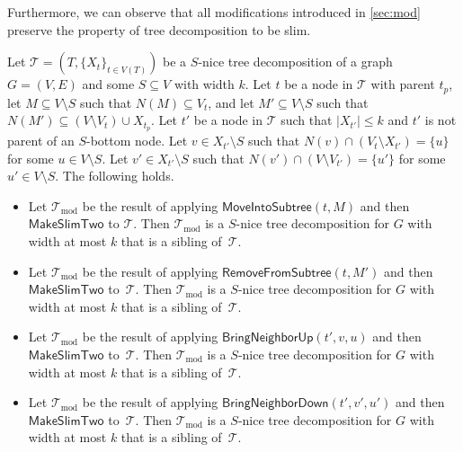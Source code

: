 \documentclass[a4paper,UKenglish,cleveref, autoref, thm-restate, numberwithinsect]{lipics-v2021}
\newcounter{modification}
\newcommand{\slim}{\text{slim}\xspace}
\newcommand{\MoveIntoSubtree}{\mathsf{MoveIntoSubtree}}
\newcommand{\RemoveFromSubtree}{\mathsf{RemoveFromSubtree}}
\newcommand{\BringNeighborUp}{\mathsf{BringNeighborUp}}
\newcommand{\BringNeighborDown}{\mathsf{BringNeighborDown}}
\newcommand{\MakeSlimTwo}{\mathsf{MakeSlimTwo}}
\begin{document}
Furthermore, we can observe that all modifications introduced in \cref{sec:mod} preserve the property of tree decomposition to be slim.
\begin{observation} \label{lem:preserveslim}
     Let $\mathcal{T}=(T,\{X_t\}_{t\in V(T)})$ be a \slim $S$-nice tree decomposition of a graph $G=(V,E)$ and some $S\subseteq V$ with width $k$. Let $t$ be a node in $\mathcal{T}$ with parent $t_p$, let $M\subseteq V\setminus S$ such that $N(M)\subseteq V_{t}$, and let $M'\subseteq V\setminus S$ such that $N(M')\subseteq (V\setminus V_{t})\cup X_{t_p}$. 
Let $t'$ be a node in $\mathcal{T}$ such that $|X_{t'}|\le k$ and $t'$ is not parent of an $S$-bottom node. Let $v\in X_{t'}\setminus S$ such that $N(v)\cap (V_t\setminus X_{t'})=\{u\}$ for some $u\in V\setminus S$.
     Let $v'\in X_{t'}\setminus S$ such that $N(v')\cap (V\setminus V_{t'})=\{u'\}$ for some $u'\in V\setminus S$.          
     The following holds.
     \begin{itemize}
     \item Let $\mathcal{T}_{\text{mod}}$ be the result of applying $\MoveIntoSubtree(t, M)$ and then $\MakeSlimTwo$ to $\mathcal{T}$. Then $\mathcal{T}_{\text{mod}}$ is a \slim $S$-nice tree decomposition for $G$ with width at most $k$ that is a sibling of~$\mathcal{T}$.
\item Let $\mathcal{T}_{\text{mod}}$ be the result of applying $\RemoveFromSubtree(t, M')$ and then $\MakeSlimTwo$ to~$\mathcal{T}$. Then $\mathcal{T}_{\text{mod}}$ is a \slim $S$-nice tree decomposition for $G$ with width at most $k$ that is a sibling of~$\mathcal{T}$.
\item Let $\mathcal{T}_{\text{mod}}$ be the result of applying $\BringNeighborUp(t', v, u)$ and then $\MakeSlimTwo$ to~$\mathcal{T}$. Then $\mathcal{T}_{\text{mod}}$ is a \slim $S$-nice tree decomposition for $G$ with width at most $k$ that is a sibling of~$\mathcal{T}$.
\item Let $\mathcal{T}_{\text{mod}}$ be the result of applying $\BringNeighborDown(t', v', u')$ and then $\MakeSlimTwo$ to~$\mathcal{T}$. Then $\mathcal{T}_{\text{mod}}$ is a \slim $S$-nice tree decomposition for $G$ with width at most $k$ that is a sibling of~$\mathcal{T}$.
\end{itemize}
 \end{observation}
\end{document}
